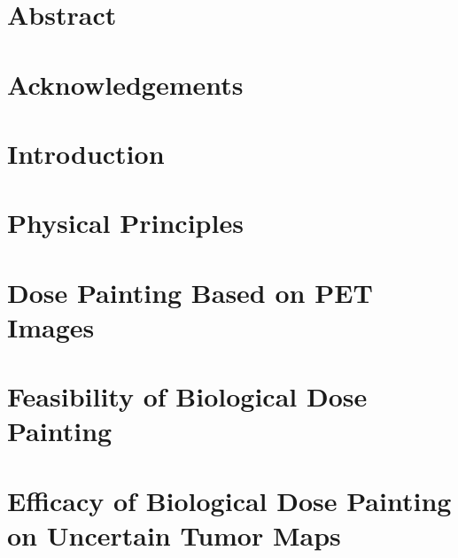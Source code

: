 



\cleardoublepage


\cleardoublepage

\chapter*{Abstract}{}
\thispagestyle{empty}
\cleardoublepage

\chapter*{Acknowledgements}{}
\thispagestyle{empty}
\cleardoublepage

\newpage
\setcounter{page}{1}
\pagestyle{headings}

\renewcommand{\contentsname}{Table of Contents}
\tableofcontents
\cleardoublepage

\newpage
\setcounter{page}{1}

\chapter{Introduction}\label{chapter:1}


\chapter{Physical Principles}\label{chapter:2}


\chapter{Dose Painting Based on PET Images}\label{chapter:3}


\chapter{Feasibility of Biological Dose Painting}\label{chapter:4}


\chapter[Efficacy of Biological Dose Painting]{Efficacy of Biological Dose Painting on Uncertain Tumor Maps}\label{chapter:5}


